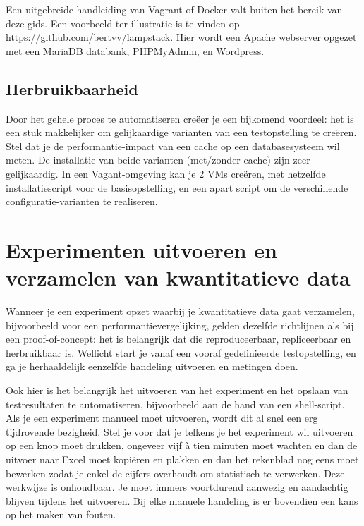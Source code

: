 Een uitgebreide handleiding van Vagrant of Docker valt buiten het bereik van deze gids. Een voorbeeld ter illustratie is te vinden op \url{https://github.com/bertvv/lampstack}. Hier wordt een Apache webserver opgezet met een MariaDB databank, PHPMyAdmin, en Wordpress.

\subsection{Herbruikbaarheid}%
\label{ssec:herbruikbaarheid}

Door het gehele proces te automatiseren creëer je een bijkomend voordeel: het is een stuk makkelijker om gelijkaardige varianten van een testopstelling te creëren. Stel dat je de performantie-impact van een cache op een databasesysteem wil meten. De installatie van beide varianten (met/zonder cache) zijn zeer gelijkaardig. In een Vagant-omgeving kan je 2 VMs creëren, met hetzelfde installatiescript voor de basisopstelling, en een apart script om de verschillende configuratie-varianten te realiseren.

\section{Experimenten uitvoeren en verzamelen van kwantitatieve data}%
\label{sec:experimenten-uitvoeren}

Wanneer je een experiment opzet waarbij je kwantitatieve data gaat verzamelen, bijvoorbeeld voor een performantievergelijking, gelden dezelfde richtlijnen als bij een proof-of-concept: het is belangrijk dat die reproduceerbaar, repliceerbaar en herbruikbaar is. Wellicht start je vanaf een vooraf gedefinieerde testopstelling, en ga je herhaaldelijk eenzelfde handeling uitvoeren en metingen doen.

Ook hier is het belangrijk het uitvoeren van het experiment en het opslaan van testresultaten te automatiseren, bijvoorbeeld aan de hand van een shell-script. Als je een experiment manueel moet uitvoeren, wordt dit al snel een erg tijdrovende bezigheid. Stel je voor dat je telkens je het experiment wil uitvoeren op een knop moet drukken, ongeveer vijf à tien minuten moet wachten en dan de uitvoer naar Excel moet kopiëren en plakken en dan het rekenblad nog eens moet bewerken zodat je enkel de cijfers overhoudt om statistisch te verwerken. Deze werkwijze is onhoudbaar. Je moet immers voortdurend aanwezig en aandachtig blijven tijdens het uitvoeren. Bij elke manuele handeling is er bovendien een kans op het maken van fouten.

